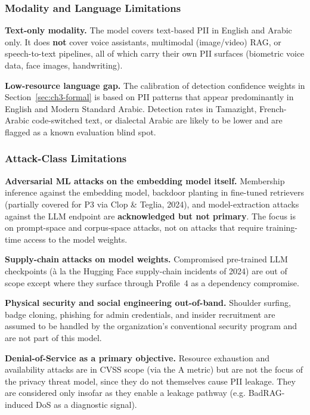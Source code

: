 \documentclass[12pt,a4paper]{report}
\begin{document}
\subsubsection{Modality and Language Limitations}

\begin{limitbox}
\textbf{Text-only modality.} The model covers text-based PII in English
and Arabic only. It does \textbf{not} cover voice assistants, multimodal
(image/video) RAG, or speech-to-text pipelines, all of which carry their
own PII surfaces (biometric voice data, face images, handwriting).

\textbf{Low-resource language gap.} The calibration of detection
confidence weights in Section~\ref{sec:ch3-formal} is based on PII patterns that appear
predominantly in English and Modern Standard Arabic. Detection rates in
Tamazight, French-Arabic code-switched text, or dialectal Arabic are
likely to be lower and are flagged as a known evaluation blind spot.
\end{limitbox}

\subsubsection{Attack-Class Limitations}

\begin{limitbox}
\textbf{Adversarial ML attacks on the embedding model itself.}
Membership inference against the embedding model, backdoor planting in
fine-tuned retrievers (partially covered for P3 via Clop \& Teglia, 2024),
and model-extraction attacks against the LLM endpoint are
\textbf{acknowledged but not primary}. The focus is on prompt-space and
corpus-space attacks, not on attacks that require training-time access to
the model weights.

\textbf{Supply-chain attacks on model weights.} Compromised pre-trained
LLM checkpoints (à la the Hugging Face supply-chain incidents of 2024)
are out of scope except where they surface through Profile~4 as a
dependency compromise.

\textbf{Physical security and social engineering out-of-band.} Shoulder
surfing, badge cloning, phishing for admin credentials, and insider
recruitment are assumed to be handled by the organization's conventional
security program and are not part of this model.

\textbf{Denial-of-Service as a primary objective.} Resource exhaustion
and availability attacks are in CVSS scope (via the A metric) but are
not the focus of the privacy threat model, since they do not themselves
cause PII leakage. They are considered only insofar as they enable
a leakage pathway (e.g. BadRAG-induced DoS as a diagnostic signal).
\end{limitbox}
\end{document}

